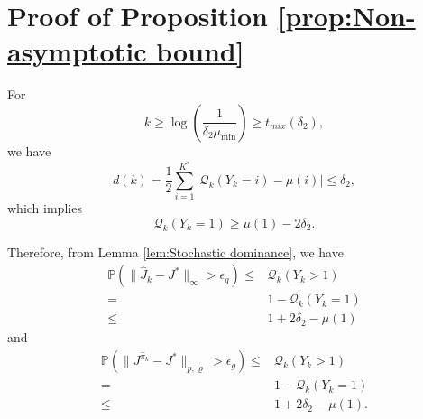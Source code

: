 \documentclass[12pt,technote,onecolumn]{IEEEtran}
\begin{document}
\section*{Proof of Proposition \ref{prop:Non-asymptotic bound}}
\begin{IEEEproof}
	For $$k\geq\log\left(\frac{1}{\delta_{2}\mu_{\min}}\right)\geq t_{mix}\left(\delta_{2}\right),$$
	we have
	\[
	d\left(k\right)=\frac{1}{2}\sum_{i=1}^{K^{*}}\left|\mathcal{Q}_{k}\left(Y_{k}=i\right)-\mu\left(i\right)\right|\leq\delta_{2},
	\]
	which implies
	\[
	\mathcal{Q}_{k}\left(Y_{k}=1\right)\geq\mu\left(1\right)-2\delta_{2}.
	\]
	
	Therefore, from Lemma \ref{lem:Stochastic dominance}, we have
	\begin{equation*}
	\begin{aligned}
	\mathbb{P}\left(\|\widehat{J}_{k}-J^{*}\|_{\infty}>\epsilon_{g}\right)
	\leq&\mathcal{Q}_{k}\left(Y_{k}>1\right)\\
	=&1-\mathcal{Q}_{k}\left(Y_{k}=1\right)\\
	\leq&1+2\delta_{2}-\mu\left(1\right)
	\end{aligned}
	\end{equation*}
	and
	\begin{equation*}
	\begin{aligned}
	\mathbb{P}\left(\|J^{\widehat{\pi}_{k}}-J^{*}\|_{p,\varrho}>\epsilon_{g}\right)
	\leq&\mathcal{Q}_{k}\left(Y_{k}>1\right)\\
	=&1-\mathcal{Q}_{k}\left(Y_{k}=1\right)\\
	\leq&1+2\delta_{2}-\mu\left(1\right).
	\end{aligned}
	\end{equation*}
\end{IEEEproof}

%
%
%
%


\ifCLASSOPTIONcaptionsoff
  \newpage
\fi
\end{document}
